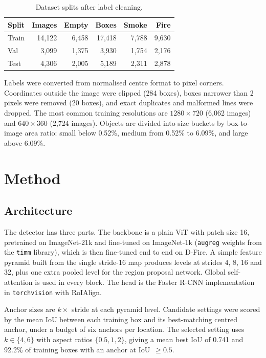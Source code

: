 \documentclass[conference]{IEEEtran}
\begin{document}
\begin{table}[t]
\centering
\caption{Dataset splits after label cleaning.}
\label{tab:data}
\begin{tabular}{lrrrrr}
\toprule
Split & Images & Empty & Boxes & Smoke & Fire \\
\midrule
Train & 14{,}122 & 6{,}458 & 17{,}418 & 7{,}788 & 9{,}630 \\
Val   & 3{,}099  & 1{,}375 & 3{,}930  & 1{,}754 & 2{,}176 \\
Test  & 4{,}306  & 2{,}005 & 5{,}189  & 2{,}311 & 2{,}878 \\
\bottomrule
\end{tabular}
\end{table}

Labels were converted from normalised centre format to pixel corners. Coordinates outside the image were clipped (284 boxes), boxes narrower than 2 pixels were removed (20 boxes), and exact duplicates and malformed lines were dropped. The most common training resolutions are $1280\times720$ (6{,}062 images) and $640\times360$ (2{,}724 images). Objects are divided into size buckets by box-to-image area ratio: small below 0.52\%, medium from 0.52\% to 6.09\%, and large above 6.09\%.

\section{Method}
\subsection{Architecture}
The detector has three parts. The backbone is a plain ViT with patch size 16, pretrained on ImageNet-21k and fine-tuned on ImageNet-1k (\texttt{augreg} weights from the \texttt{timm} library), which is then fine-tuned end to end on D-Fire. A simple feature pyramid built from the single stride-16 map produces levels at strides 4, 8, 16 and 32, plus one extra pooled level for the region proposal network. Global self-attention is used in every block. The head is the Faster R-CNN implementation in \texttt{torchvision} with RoIAlign.

Anchor sizes are $k\times$ stride at each pyramid level. Candidate settings were scored by the mean IoU between each training box and its best-matching centred anchor, under a budget of six anchors per location. The selected setting uses $k\in\{4,6\}$ with aspect ratios $\{0.5,1,2\}$, giving a mean best IoU of 0.741 and 92.2\% of training boxes with an anchor at IoU~$\ge0.5$.
\end{document}
